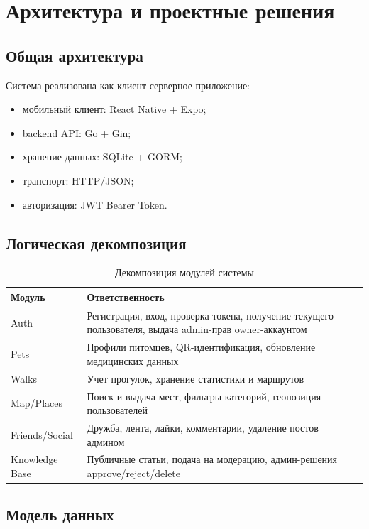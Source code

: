 \documentclass[12pt,a4paper]{article}
\begin{document}
\section{Архитектура и проектные решения}

\subsection{Общая архитектура}

Система реализована как клиент-серверное приложение:
\begin{itemize}
  \item мобильный клиент: React Native + Expo;
  \item backend API: Go + Gin;
  \item хранение данных: SQLite + GORM;
  \item транспорт: HTTP/JSON;
  \item авторизация: JWT Bearer Token.
\end{itemize}

\subsection{Логическая декомпозиция}

\begin{table}[H]
\centering
\small
\caption{Декомпозиция модулей системы}
\begin{tabular}{|L{0.3\textwidth}|L{0.62\textwidth}|}
\hline
\textbf{Модуль} & \textbf{Ответственность} \\
\hline
Auth & Регистрация, вход, проверка токена, получение текущего пользователя, выдача admin-прав owner-аккаунтом \\
\hline
Pets & Профили питомцев, QR-идентификация, обновление медицинских данных \\
\hline
Walks & Учет прогулок, хранение статистики и маршрутов \\
\hline
Map/Places & Поиск и выдача мест, фильтры категорий, геопозиция пользователей \\
\hline
Friends/Social & Дружба, лента, лайки, комментарии, удаление постов админом \\
\hline
Knowledge Base & Публичные статьи, подача на модерацию, админ-решения approve/reject/delete \\
\hline
\end{tabular}
\end{table}

\subsection{Модель данных}
\end{document}

